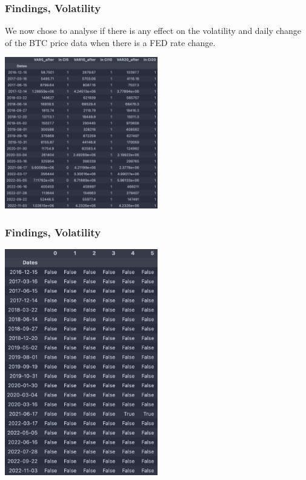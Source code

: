 \documentclass{beamer}
\begin{document}
\begin{frame}
    \frametitle{Findings, Volatility}
We now chose to analyse if there is any effect on the volatility and daily change of the BTC price data when there is a FED rate change.
\begin{center}
 \includegraphics[width=0.5\textwidth]{research_project/text/paper/7.png}

\end{center}

\end{frame}
\begin{frame}
    \frametitle{Findings, Volatility}

\begin{center}
 
\includegraphics[width=0.5\textwidth]{research_project/text/paper/10.png}     

\end{center}

\end{frame}
\end{document}
